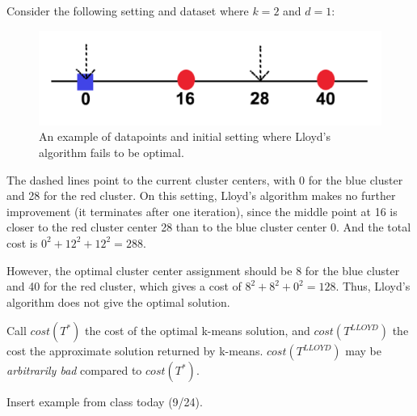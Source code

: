 \begin{example} Consider the following setting and dataset
where $k=2$ and $d=1$:
\begin{figure}
    \centering
    \captionsetup{width=0.8\textwidth}
    \includegraphics[scale=0.4]{chapter_1/files/kmeans.png}
    \caption{An example of datapoints and initial setting where
    Lloyd's algorithm fails to be optimal.}
    \label{fig:kmeans}
\end{figure}

The dashed lines point to the current cluster centers, with 0
for the blue cluster and 28 for the red cluster. On this
setting, Lloyd's algorithm makes no further improvement (it
terminates after one iteration), since the middle point at 16
is closer to the red cluster center 28 than to the blue cluster
center 0. And the total cost is $0^2+12^2+12^2=288$.

However, the optimal cluster center assignment should be 8 for
the blue cluster and 40 for the red cluster, which gives a cost
of $8^2+8^2+0^2=128$. Thus, Lloyd's algorithm does not give the
optimal solution.
\end{example}

\begin{remark}
Call $cost(T^*)$ the cost of the optimal k-means solution, and $cost(T^{LLOYD})$ the cost the approximate solution returned by k-means. $cost(T^{LLOYD})$ may be \emph{arbitrarily bad} compared to $cost(T^*)$.
\end{remark}

\begin{example} 
Insert example from class today (9/24). 
\end{example}




